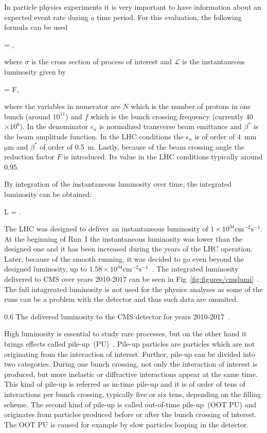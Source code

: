 In particle physics experiments it is very important to have information about an expected event rate during a time period. For this evaluation, the following formula can be used

{
  = \sigma \times {},
}

where $\sigma$ is the cross section of process of interest and $\mathcal{L}$ is the instantaneous luminosity given by

{
  = F,
}

where the variables in numerator are $N$ which is the number of protons in one bunch (around $10^{11}$) and $f$ which is the bunch crossing frequency (currently 40$\times 10^{6}$). In the denominator $\epsilon_{n}$ is normalized transverse beam emittance and $\beta^{*}$ is the beam amplitude function. In the LHC conditions the  $\epsilon_{n}$ is of order of 4~mm~$\mathrm{\mu m}$ and $\beta^{*}$ of order of 0.5~m. Lastly, because of the beam crossing angle the reduction factor $F$ is introduced. Its value in the LHC conditions typically around 0.95.

By integration of the instantaneous luminosity over time, the integrated luminosity can be obtained:

{
 L = .
}

The LHC was designed to deliver an instantaneous luminosity of $1 \times 10^{34} \mathrm{cm^{-2}s^{-1}}$. At the beginning of Run~I the instantaneous luminosity was lower than the designed one and it has been increased during the years of the LHC operation. Later, because of the smooth running, it was decided to go even beyond the designed luminosity, up to $1.58 \times 10^{34} \mathrm{cm^{-2}s^{-1}}$~\cite{Pralavorio:2272474}. The integrated luminosity delivered to CMS over years 2010-2017 can be seen in Fig~\ref{fig:figures/cmslumi}~\cite{website:CMSlumi}. The full intagreated luminosity is not used for the physics analyses as some of the runs can be a problem with the detector and thus such data are ommited.

                 {0.6}       %
                 { The delivered luminosity to the CMS detector for years 2010-2017~\cite{website:CMSlumi}. }


High luminosity is essential to study rare processes, but on the other hand it brings effects called pile-up~(PU)~\cite{Bayatian:2006nff}. Pile-up particles are particles which are not originating from the interaction of interest. Further, pile-up can be divided into two categories. During one bunch crossing, not only the interaction of interest is produced, but more inelastic or diffractive interactions appear at the same time. This kind of pile-up is referred as in-time pile-up and it is of order of tens of interactions per bunch crossing, typically five or six tens, depending on the filling scheme. The second kind of pile-up is called out-of-time pile-up~(OOT PU) and originates from particles produced before or after the bunch crossing of interest. The OOT PU is caused for example by slow particles looping in the detector.

